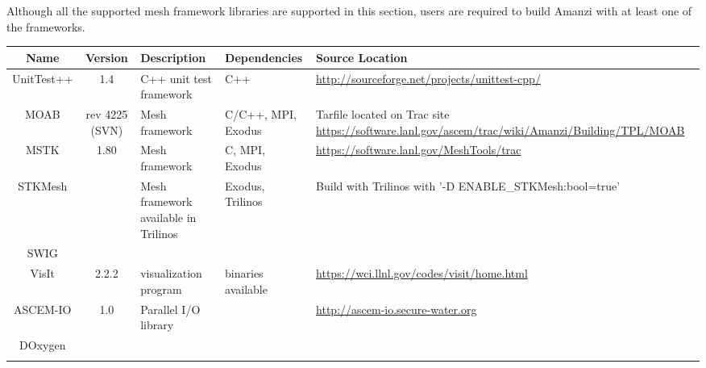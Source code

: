 \documentclass[12pt]{article}
\begin{document}
Although all the supported mesh framework libraries are supported in this section, users are required to build
Amanzi with at least one of the frameworks. 

\begin{table}[htdp]
\begin{center}
\begin{tabular}{|c|c|p{3cm}|p{3cm}|p{3cm}|}
\hline
\hline
Name & Version & Description & Dependencies & Source Location \\
\hline
UnitTest++ & 1.4 & C++ unit test framework & C++ & \url{http://sourceforge.net/projects/unittest-cpp/} \\
\hline
MOAB & rev 4225 (SVN) & Mesh framework & C/C++, MPI, Exodus & Tarfile located on Trac site \url{https://software.lanl.gov/ascem/trac/wiki/Amanzi/Building/TPL/MOAB}  \\
\hline
MSTK & 1.80 & Mesh framework & C, MPI, Exodus & \url{https://software.lanl.gov/MeshTools/trac}\\
\hline
STKMesh & & Mesh framework available in Trilinos & Exodus, Trilinos & Build with Trilinos with '-D ENABLE\_STKMesh:bool=true'  \\
\hline
SWIG &&&& \\
\hline
VisIt & 2.2.2 & visualization program & binaries available &  \url{https://wci.llnl.gov/codes/visit/home.html} \\
\hline
ASCEM-IO & 1.0 & Parallel I/O library &  & \url{http://ascem-io.secure-water.org} \\
\hline
DOxygen &&&& \\

&&&& \\
\hline


\end{tabular}
\end{center}
\label{tab:opt_tpl}
\end{table}%
\end{document}
